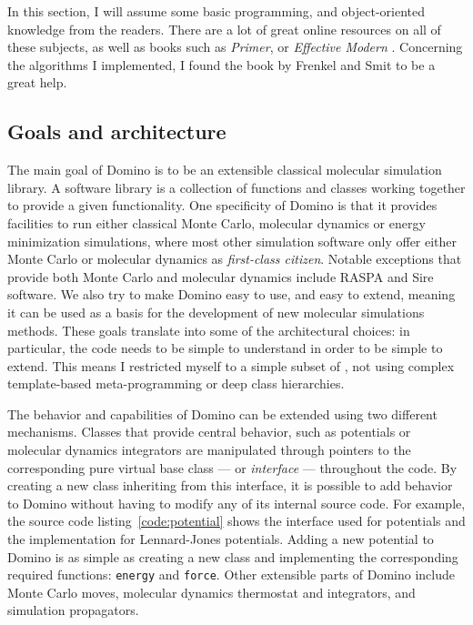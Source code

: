 \documentclass[thesis]{subfiles}
\begin{document}
In this section, I will assume some basic programming, \cxx and object-oriented
knowledge from the readers. There are a lot of great online resources on all of
these subjects, as well as books such as \emph{\cxx Primer}\cite{Lippman2012},
or \emph{Effective Modern \cxx}\cite{Meyers2014}. Concerning the algorithms I
implemented, I found the book by Frenkel and Smit\cite{Frenkel2002} to be a
great help.

\subsection{Goals and architecture}

The main goal of Domino is to be an extensible classical molecular simulation
library. A software library is a collection of functions and classes working
together to provide a given functionality. One specificity of Domino is that it
provides facilities to run either classical Monte Carlo, molecular dynamics or
energy minimization simulations, where most other simulation software only offer
either Monte Carlo or molecular dynamics as \emph{first-class citizen}. Notable
exceptions that provide both Monte Carlo and molecular dynamics include
RASPA\cite{Dubbeldam2015} and Sire\cite{SireMol} software. We also try to make
Domino easy to use, and easy to extend, meaning it can be used as a basis for
the development of new molecular simulations methods. These goals translate into
some of the architectural choices: in particular, the code needs to be simple to
understand in order to be simple to extend. This means I restricted myself to a
simple subset of \cxx, not using complex template-based meta-programming or deep
class hierarchies.

The behavior and capabilities of Domino can be extended using two different
mechanisms. Classes that provide central behavior, such as potentials or
molecular dynamics integrators are manipulated through pointers to the
corresponding pure virtual base class --- or \emph{interface} --- throughout the
code. By creating a new class inheriting from this interface, it is possible to
add behavior to Domino without having to modify any of its internal source code.
For example, the source code listing~\ref{code:potential} shows the interface
used for potentials and the implementation for Lennard-Jones potentials. Adding
a new potential to Domino is as simple as creating a new class and implementing
the corresponding required functions: \texttt{energy} and \texttt{force}. Other
extensible parts of Domino include Monte Carlo moves, molecular dynamics
thermostat and integrators, and simulation propagators.
\end{document}
